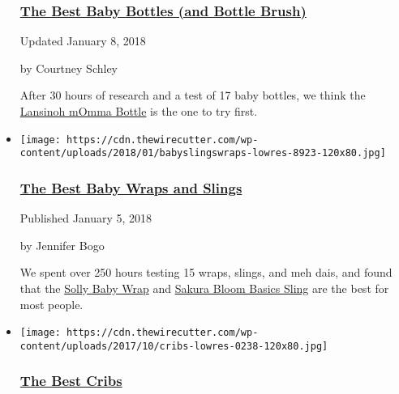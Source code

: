 \begin{itemize}
  \hypertarget{the-best-baby-bottles-and-bottle-brush}{%
  \subsubsection{\texorpdfstring{\href{https://www.nytimes3xbfgragh.onion/wirecutter/reviews/best-baby-bottles-and-bottle-brush/}{The
  Best Baby Bottles (and Bottle
  Brush)}}{The Best Baby Bottles (and Bottle Brush)}}\label{the-best-baby-bottles-and-bottle-brush}}

  Updated January 8, 2018

  by Courtney Schley

  After 30 hours of research and a test of 17 baby bottles, we think the
  \href{https://www.nytimes3xbfgragh.onion/wirecutter/out/link/24488/0/4/70051/}{Lansinoh
  mOmma Bottle} is the one to try first.
\item
  \href{https://www.nytimes3xbfgragh.onion/wirecutter/reviews/best-baby-wraps-and-slings/}{}

  \texttt{[image: https://cdn.thewirecutter.com/wp-content/uploads/2018/01/babyslingswraps-lowres-8923-120x80.jpg]}

  \hypertarget{the-best-baby-wraps-and-slings}{%
  \subsubsection{\texorpdfstring{\href{https://www.nytimes3xbfgragh.onion/wirecutter/reviews/best-baby-wraps-and-slings/}{The
  Best Baby Wraps and
  Slings}}{The Best Baby Wraps and Slings}}\label{the-best-baby-wraps-and-slings}}

  Published January 5, 2018

  by Jennifer Bogo

  We spent over 250 hours testing 15 wraps, slings, and meh dais, and
  found that the
  \href{https://www.nytimes3xbfgragh.onion/wirecutter/out/link/24454/164603/4/69976/?merchant=Nordstrom}{Solly
  Baby Wrap} and
  \href{https://www.nytimes3xbfgragh.onion/wirecutter/out/link/24455/130270/4/69980/?merchant=Sakura\%20Bloom}{Sakura
  Bloom Basics Sling} are the best for most people.
\item
  \href{https://www.nytimes3xbfgragh.onion/wirecutter/reviews/best-cribs/}{}

  \texttt{[image: https://cdn.thewirecutter.com/wp-content/uploads/2017/10/cribs-lowres-0238-120x80.jpg]}

  \hypertarget{the-best-cribs}{%
  \subsubsection{\texorpdfstring{\href{https://www.nytimes3xbfgragh.onion/wirecutter/reviews/best-cribs/}{The
  Best Cribs}}{The Best Cribs}}\label{the-best-cribs}}


\end{itemize}
